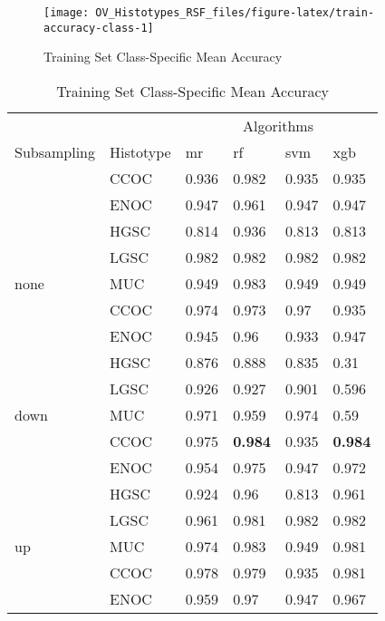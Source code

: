 \documentclass[
]{report}
\begin{document}
\begin{figure}[H]

{\centering \texttt{[image: OV\_Histotypes\_RSF\_files/figure-latex/train-accuracy-class-1]} 

}

\caption{Training Set Class-Specific Mean Accuracy}\label{fig:train-accuracy-class}
\end{figure}

\begin{table}

\caption{\label{tab:train-accuracy-class-table}Training Set Class-Specific Mean Accuracy}
\centering
\begin{tabular}[t]{l|l|l|l|l|l}
\hline
\multicolumn{2}{c|}{ } & \multicolumn{4}{c}{Algorithms} \\
\cline{3-6}
Subsampling & Histotype & mr & rf & svm & xgb\\
\hline
 & CCOC & 0.936 & 0.982 & 0.935 & 0.935\\
\cline{2-6}
 & ENOC & 0.947 & 0.961 & 0.947 & 0.947\\
\cline{2-6}
 & HGSC & 0.814 & 0.936 & 0.813 & 0.813\\
\cline{2-6}
 & LGSC & 0.982 & 0.982 & 0.982 & 0.982\\
\cline{2-6}
\multirow{-5}{*}{\raggedright\arraybackslash none} & MUC & 0.949 & 0.983 & 0.949 & 0.949\\
\cline{1-6}
 & CCOC & 0.974 & 0.973 & 0.97 & 0.935\\
\cline{2-6}
 & ENOC & 0.945 & 0.96 & 0.933 & 0.947\\
\cline{2-6}
 & HGSC & 0.876 & 0.888 & 0.835 & 0.31\\
\cline{2-6}
 & LGSC & 0.926 & 0.927 & 0.901 & 0.596\\
\cline{2-6}
\multirow{-5}{*}{\raggedright\arraybackslash down} & MUC & 0.971 & 0.959 & 0.974 & 0.59\\
\cline{1-6}
 & CCOC & 0.975 & \textbf{0.984} & 0.935 & \textbf{0.984}\\
\cline{2-6}
 & ENOC & 0.954 & 0.975 & 0.947 & 0.972\\
\cline{2-6}
 & HGSC & 0.924 & 0.96 & 0.813 & 0.961\\
\cline{2-6}
 & LGSC & 0.961 & 0.981 & 0.982 & 0.982\\
\cline{2-6}
\multirow{-5}{*}{\raggedright\arraybackslash up} & MUC & 0.974 & 0.983 & 0.949 & 0.981\\
\cline{1-6}
 & CCOC & 0.978 & 0.979 & 0.935 & 0.981\\
\cline{2-6}
 & ENOC & 0.959 & 0.97 & 0.947 & 0.967\\

\end{tabular}
\end{table}
\end{document}
